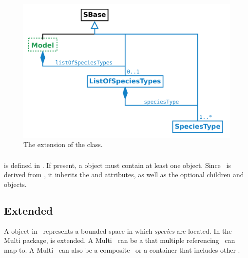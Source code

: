 \begin{figure}[htb]
  \begin{center}
    \includegraphics[scale=0.37]{./figs/multi_001_model.pdf}
    \caption{The extension of the \Model class.}
  \label{fig:Model}
  \end{center}
\end{figure}

\subsubsection{}
\label{def:ListOfSpeciesTypes}

 is defined in . If present, a \ListOfSpeciesTypes object must contain at least one \SpeciesType object.  Since \ListOfSpeciesTypes\ is derived from , it inherits the  and  attributes, as well as the optional children  and  objects. 

\clearpage

\subsection{Extended }
\label{def:Compartment}

A \Compartment object in \SbmlLevelThreeCore\ represents a bounded space in which \textit{species} are located. In the Multi package, \Compartment is extended. A Multi \compartment\ can be a  that multiple referencing \compartments\ can map to. A Multi \compartment\ can also be a composite \compartment\ or a container that includes other \compartments.

